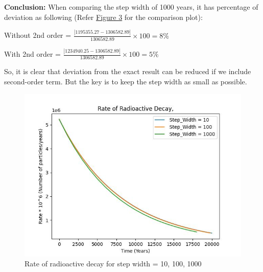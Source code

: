 \documentclass[11pt]{article}
\begin{document}
\textbf{Conclusion:} When comparing the step width of 1000 years, it has percentage of deviation as following (Refer \hyperref[fig:Rate of radioactive decay for step width = 1000, with 2nd order term]{Figure 3} for the comparison plot):

Without 2nd order = $\frac{\left|1195355.27 - 1306582.89\right|}{1306582.89} \times 100 = 8\%$

With 2nd order = $\frac{\left|1234940.25 - 1306582.89\right|}{1306582.89} \times 100 = 5\% $

So, it is clear that deviation from the exact result can be reduced if we include second-order term. But the key is to keep the step width as small as possible.

\begin{figure}[b]
    \centering
    \includegraphics[width=\textwidth, height=\textheight, keepaspectratio]{Carbon_plot_10_100_1000.jpeg}
    \caption{Rate of radioactive decay for step width = 10, 100, 1000}
    \label{fig:Rate of radioactive decay for step width = 10, 100, 1000}
\end{figure}
\end{document}
